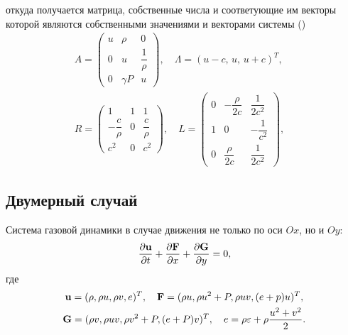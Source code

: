 \documentclass[12pt,a4paper]{article}
\newcommand{\dpartial}[2]{\dfrac{ \partial #1 }{ \partial #2 }}
\begin{document}
      \noindent откуда получается матрица, собственные числа и соответующие им векторы которой являются собственными значениями и векторами системы ()
      \begin{equation}
        \label{eigen1d}
        \begin{array}{c}
                A = \begin{pmatrix}
                    u & \rho & 0 \\
                    0 & u & \dfrac{1}{\rho} \\
                    0 & \gamma P & u
                \end{pmatrix}, \quad
                \Lambda = (
                    u - c,\, u,\, u + c
                )^T, \\[0.9em]
                R = \begin{pmatrix}
                    1 & 1 & 1 \\[2mm]
                    -\dfrac{c}{\rho} & 0 & \dfrac{c}{\rho} \\[4mm]
                    c^2 & 0 & c^2
                \end{pmatrix}, \quad 
                L = \begin{pmatrix}
                    0 & -\dfrac{\rho}{2c} & \dfrac{1}{2c^2} \\[3mm]
                    1 & 0 & -\dfrac{1}{c^2} \\[3mm]
                    0 & \dfrac{\rho}{2c} & \dfrac{1}{2 c^2}
                \end{pmatrix}, \quad 
            \end{array}
    \end{equation}

        \subsection{Двумерный случай}

        Система газовой динамики в случае движения не только по оси $Ox$, но и $Oy \colon$
        \begin{equation}
            \label{system:2d}
            \dpartial{\bold u}{t} + \dpartial{\bold F}{x} + \dpartial{\bold G}{y} = 0,
        \end{equation}
        \noindent где 
        \begin{gather*}
            \bold u = (\rho, \rho u, \rho v, e)^T, \quad \bold F = (\rho u, \rho u^2 + P, \rho u v, (e + p) u)^T, \\
            \bold G = (\rho v, \rho u v, \rho v^2 + P, (e + P) v)^T, \quad e = \rho \varepsilon + \rho \dfrac{u^2 + v^2}{2}.
        \end{gather*}
\end{document}
